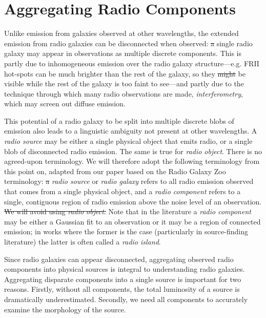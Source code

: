\documentclass[11pt, a4paper]{book}
\newcommand{\defn}[1]{\emph{#1}}
\providecommand{\DIFaddtex}[1]{{\protect\color{blue}\uwave{#1}}} %
\providecommand{\DIFdeltex}[1]{{\protect\color{red}\sout{#1}}}                      %
\providecommand{\DIFaddbegin}{} %
\providecommand{\DIFaddend}{} %
\providecommand{\DIFdelbegin}{} %
\providecommand{\DIFdelend}{} %
\providecommand{\DIFadd}[1]{\texorpdfstring{\DIFaddtex{#1}}{#1}} %
\providecommand{\DIFdel}[1]{\texorpdfstring{\DIFdeltex{#1}}{}} %
\newcommand{\DIFscaledelfig}{0.5}
\newlength{\DIFdelgraphicswidth} %
\newlength{\DIFdelgraphicsheight} %
\newcommand{\DIFaddincludegraphics}[2][]{{\color{blue}\fbox{\DIFOincludegraphics[#1]{#2}}}} %
\newcommand{\DIFdelincludegraphics}[2][]{%
\sbox{\DIFdelgraphicsbox}{\DIFOincludegraphics[#1]{#2}}%
\settoboxwidth{\DIFdelgraphicswidth}{\DIFdelgraphicsbox} %
\settoboxtotalheight{\DIFdelgraphicsheight}{\DIFdelgraphicsbox} %
\scalebox{\DIFscaledelfig}{%
\parbox[b]{\DIFdelgraphicswidth}{\usebox{\DIFdelgraphicsbox}\\[-\baselineskip] \rule{\DIFdelgraphicswidth}{0em}}\llap{\resizebox{\DIFdelgraphicswidth}{\DIFdelgraphicsheight}{%
\setlength{\unitlength}{\DIFdelgraphicswidth}%
\begin{picture}(1,1)%
\thicklines\linethickness{2pt} %
{\color[rgb]{1,0,0}\put(0,0){\framebox(1,1){}}}%
{\color[rgb]{1,0,0}\put(0,0){\line( 1,1){1}}}%
{\color[rgb]{1,0,0}\put(0,1){\line(1,-1){1}}}%
\end{picture}%
}\hspace*{3pt}}} %
} %
\DeclareRobustCommand{\DIFaddbegin}{\DIFOaddbegin \let\includegraphics\DIFaddincludegraphics} %
\DeclareRobustCommand{\DIFaddend}{\DIFOaddend \let\includegraphics\DIFOincludegraphics} %
\DeclareRobustCommand{\DIFdelbegin}{\DIFOdelbegin \let\includegraphics\DIFdelincludegraphics} %
\DeclareRobustCommand{\DIFdelend}{\DIFOaddend \let\includegraphics\DIFOincludegraphics} %
\begin{document}
\section{Aggregating Radio Components}
\label{sec:aggregation}

    Unlike emission from galaxies observed at other wavelengths, the extended emission from radio galaxies can be disconnected when observed: \DIFdelbegin \DIFdel{a }\DIFdelend \DIFaddbegin \DIFadd{A }\DIFaddend single radio galaxy may appear in observations as multiple discrete components. This is partly due to inhomogeneous emission over the radio galaxy structure---e.g. FRII hot-spots can be much brighter than the rest of the galaxy, so they \DIFdelbegin \DIFdel{might }\DIFdelend \DIFaddbegin \DIFadd{may }\DIFaddend be visible while the rest of the galaxy is too faint to see---and partly due to the technique through which many radio observations are made, \defn{interferometry}, which may screen out diffuse emission.

    This potential of a radio galaxy to be split into multiple discrete blobs of emission also leads to a linguistic ambiguity not present at other wavelengths. A \defn{radio source} may be either a single physical object that emits radio, or a single blob of disconnected radio emission. The same is true for \defn{radio object}. There is no agreed-upon terminology. We will therefore adopt the following terminology from this point on, adapted from our paper \citep{alger18radio} based on the Radio Galaxy Zoo terminology: \DIFdelbegin \DIFdel{a }\DIFdelend \DIFaddbegin \DIFadd{A }\DIFaddend \defn{radio source} or \defn{radio galaxy} refers to all radio emission observed that comes from a single physical object, and a \defn{radio component} refers to a single, contiguous region of radio emission above the noise level of an observation. \DIFdelbegin \DIFdel{We will avoid using \defn{radio object}. }\DIFdelend Note that in the literature a \defn{radio component} may be either a Gaussian fit to an observation or it may be a region of connected emission; in works where the former is the case (particularly in source-finding literature) the latter is often called a \defn{radio island}.

    Since radio galaxies can appear disconnected, aggregating observed radio components into physical sources is integral to understanding radio galaxies. Aggregating disparate components into a single source is important for two reasons. Firstly, without all components, the total luminosity of a source is dramatically underestimated. Secondly, we need all components to accurately examine the morphology of the source.
\end{document}
